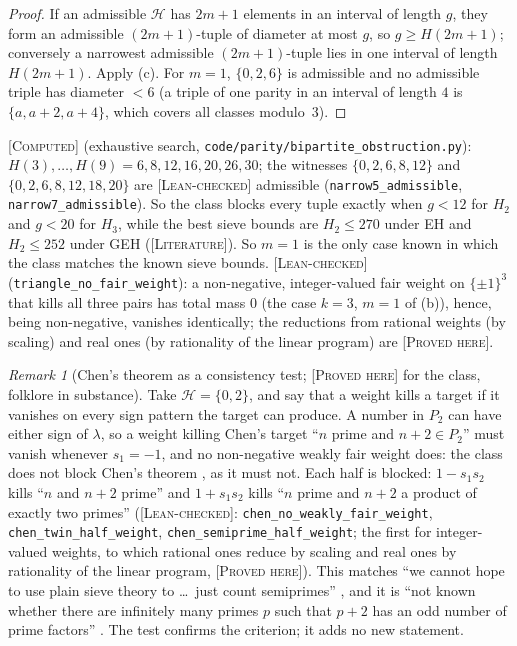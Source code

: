 \documentclass[11pt]{amsart}
\theoremstyle{definition}
\theoremstyle{remark}
\newtheorem{remark}[theorem]{Remark}
\newcommand{\lbl}[1]{\textup{\textsc{[#1]}}}
\begin{document}
\begin{proof}
If an admissible $\mathcal H$ has $2m+1$ elements in an interval of length $g$,
they form an admissible $(2m+1)$-tuple of diameter at most $g$, so
$g\ge H(2m+1)$; conversely a narrowest admissible $(2m+1)$-tuple lies in one
interval of length $H(2m+1)$. Apply (c). For $m=1$, $\{0,2,6\}$ is admissible
and no admissible triple has diameter $<6$ (a triple of one parity in an
interval of length $4$ is $\{a,a+2,a+4\}$, which covers all classes
modulo~$3$).
\end{proof}

\begin{sloppypar}
\lbl{Computed} (exhaustive search, \texttt{code/}\allowbreak\texttt{parity/}\allowbreak\texttt{bipartite\_obstruction.py}):
$H(3),\dots,H(9)=6,8,12,16,20,26,30$; the witnesses $\{0,2,6,8,12\}$ and
$\{0,2,6,8,12,18,20\}$ are \lbl{Lean-checked} admissible
(\texttt{narrow5\_admissible}, \texttt{narrow7\_admissible}). So the class
blocks every tuple exactly when $g<12$ for $H_2$ and $g<20$ for $H_3$, while the
best sieve bounds are $H_2\le270$ under EH and $H_2\le252$ under GEH
\cite[Theorem~1.4(vii), (xiii)]{PM8b} (\lbl{Literature}). So $m=1$ is the only case known in which the
class matches the known sieve bounds. \lbl{Lean-checked}
(\texttt{triangle\_no\_fair\_weight}): a non-negative, integer-valued fair
weight on $\{\pm1\}^3$ that kills all three pairs has total mass $0$ (the
case $k=3$, $m=1$ of (b)), hence, being non-negative, vanishes identically; the reductions from rational weights (by scaling)
and real ones (by rationality of the linear program) are \lbl{Proved here}.
\end{sloppypar}

\begin{remark}[Chen's theorem as a consistency test; \lbl{Proved here} for the class, folklore in substance]\label{rem:chen}
Take $\mathcal H=\{0,2\}$, and say that a weight kills a target if it
vanishes on every sign pattern the target can produce. A number in $P_2$ can
have either sign of $\lambda$, so a weight killing Chen's target ``$n$ prime and $n+2\in P_2$''
must vanish whenever $s_1=-1$, and no non-negative weakly fair weight does:
the class does not block Chen's theorem \cite[Theorem~5]{Tao15c}, as it must
not. Each half is blocked: $1-s_1s_2$ kills ``$n$ and $n+2$ prime'' and
$1+s_1s_2$ kills ``$n$ prime and $n+2$ a product of exactly two primes''
(\lbl{Lean-checked}: \texttt{chen\_no\_weakly\_fair\_weight},
\texttt{chen\_twin\_half\_weight}, \texttt{chen\_semiprime\_half\_weight}; the
first for integer-valued weights, to which rational ones reduce by scaling and
real ones by rationality of the linear program, \lbl{Proved here}).
This matches ``we cannot hope to use plain sieve theory to \dots\ just count
semiprimes'' \cite{Tao07}, and it is ``not known whether there are infinitely
many primes $p$ such that $p+2$ has an odd number of prime factors''
\cite[p.~1]{Pi10}. The test confirms the criterion; it adds no new statement.
\end{remark}
\end{document}
